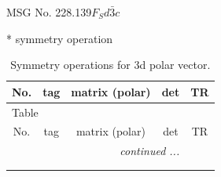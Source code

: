 \documentclass[fleqn,8pt]{jsarticle}
\begin{document}
\setcounter{MaxMatrixCols}{32}

\renewcommand{\tablename}{Table~}
\renewcommand{\figurename}{Figure~}
\begin{center}
\LARGE
MSG No. 228.139\quad$F_{S}d\bar{3}c$
\end{center}
* symmetry operation
\renewcommand{\arraystretch}{1.3}
\begin{longtable}{ccccc}
\caption{Symmetry operations for 3d polar vector.}
 \\
 \hline \hline
No. & tag & matrix (polar) & det & TR \\ \hline \endfirsthead

\multicolumn{4}{l}{\tablename\ \thetable{}} \\
 \hline \hline
No. & tag & matrix (polar) & det & TR \\ \hline \endhead

 \hline \hline
\multicolumn{4}{r}{\footnotesize\it continued ...} \\ \endfoot

 \hline \hline
\multicolumn{4}{r}{} \\ \endlastfoot


\end{longtable}
\end{document}
